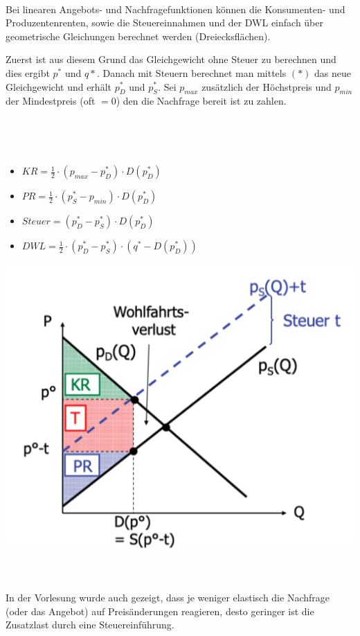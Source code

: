 \begin{kr}[Wohlfahrtsverlust] ~\\
	Bei linearen Angebots- und Nachfragefunktionen können die Konsumenten- und Produzentenrenten, sowie die Steuereinnahmen und der DWL einfach über geometrische Gleichungen berechnet werden (Dreiecksflächen). ~\bigskip
	
	Zuerst ist aus diesem Grund das Gleichgewicht ohne Steuer zu berechnen und dies ergibt $p^*$ und $q*$. Danach mit Steuern berechnet man mittels $(*)$ das neue Gleichgewicht und erhält $p_D^*$ und $p_S^*$. Sei $p_{max}$ zusätzlich der Höchstpreis und $p_{min}$ der Mindestpreis (oft $= 0$) den die Nachfrage bereit ist zu zahlen. 
	
	\begin{minipage}[t]{0.25cm}
		~\
	\end{minipage}
	\begin{minipage}[t]{7.5cm}
		\vspace{0pt} ~\bigskip
		\begin{itemize}
			\item $KR = \frac{1}{2} \cdot (p_{max} - p_D^*) \cdot D(p_D^*)$
			\item $PR = \frac{1}{2} \cdot (p_{S}^* - p_{min}) \cdot D(p_D^*)$
			\item $Steuer = (p_D^* - p_S^*) \cdot D(p_D^*)$
			\item $DWL = \frac{1}{2} \cdot (p_D^* - p_S^*) \cdot (q^* - D(p_D^*))$
		\end{itemize}
	\end{minipage}
	\hspace{0.25cm}
	\begin{minipage}[t]{4.25cm}\vspace{0pt}
		\includegraphics[scale=0.215]{img/dwl}
	\end{minipage}
\end{kr} ~\bigskip

In der Vorlesung wurde auch gezeigt, dass je weniger elastisch die Nachfrage (oder das Angebot) auf Preisänderungen reagieren, desto geringer ist die Zusatzlast durch eine Steuereinführung.